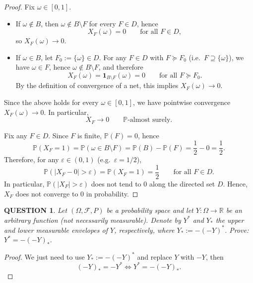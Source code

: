 \documentclass[12pt]{article}
\renewcommand{\(}{\left(}%
\renewcommand{\)}{\right)}%
\renewcommand{\[}{\left[}%
\renewcommand{\]}{\right]}%
\newcommand{\p}{\mathbb{P}}
\newtheorem{question}{QUESTION}[section]}
\newtheorem{proof}{Proof.}}
\begin{document}
\begin{proof}
Fix $\omega\in[0,1]$.
\begin{itemize}
	\item 
If $\omega\notin B$, then $\omega\notin B\setminus F$ for every $F\in D$, hence
\begin{equation*}
X_F(\omega)=0\qquad\text{for all }F\in D,
\end{equation*}
so $X_F(\omega)\to 0$.
	\item If $\omega\in B$, let $F_0:=\{\omega\}\in D$. For any $F\in D$ with $F\succeq F_0$ (i.e.\ $F\supseteq\{\omega\}$),
we have $\omega\in F$, hence $\omega\notin B\setminus F$, and therefore
\begin{equation*}
X_F(\omega)=\mathbf 1_{B\setminus F}(\omega)=0\qquad\text{for all }F\succeq F_0.
\end{equation*}
By the definition of convergence of a net, this implies $X_F(\omega)\to 0$.
\end{itemize}

Since the above holds for every $\omega\in[0,1]$, we have pointwise convergence
$X_F(\omega)\to 0$. In particular,
\begin{equation*}
X_F \to 0 \qquad \p\text{-}\text{almost surely}.
\end{equation*}

Fix any $F\in D$. Since $F$ is finite, $\p(F)=0$, hence
\begin{equation*}
\p(X_F=1)=\p(\omega\in B\setminus F)=\p(B)-\p(F)=\frac12-0=\frac12.
\end{equation*}
Therefore, for any $\varepsilon\in(0,1)$ (e.g.\ $\varepsilon=1/2$),
\begin{equation*}
\p(|X_F-0|>\varepsilon)=\p(X_F=1)=\frac12
\qquad\text{for all }F\in D.
\end{equation*}
In particular, $\p(|X_F|>\varepsilon)$ does not tend to $0$ along the directed set $D$.
Hence, $X_F$ does not converge to $0$ in probability.
\end{proof}

\begin{question}
	Let $(\Omega,\mathcal{F},P)$ be a probability space and let $Y:\Omega\to\mathbb{R}$ be an arbitrary function (not necessarily measurable).
Denote by $Y^*$ and $Y_*$ the upper and lower measurable envelopes of $Y$, respectively, where $Y_*:=-(-Y)^*$. Prove: $Y^*=-(-Y)_*$.
\end{question}
\begin{proof}
	We just need to use $Y_*:=-(-Y)^*$ and replace $Y$ with $-Y$, then
	\begin{equation*}
		(-Y)_*=-Y^*\Longleftrightarrow Y^*=-(-Y)_*.
	\end{equation*}
\end{proof}
\end{document}

